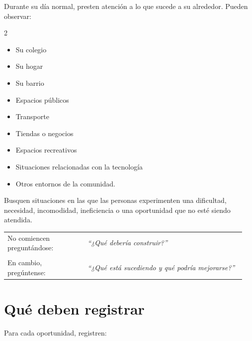 \documentclass[12pt,a4paper]{article}
\begin{document}
	Durante su día normal, presten atención a lo que sucede a su alrededor. Pueden observar:
	
	\begin{multicols}{2}
		\begin{itemize}[leftmargin=0.6cm,itemsep=0pt]
			\item Su colegio
			\item Su hogar
			\item Su barrio
			\item Espacios públicos
			\item Transporte
			\item Tiendas o negocios
			\item Espacios recreativos
			\item Situaciones relacionadas con la tecnología
			\item Otros entornos de la comunidad.
		\end{itemize}
	\end{multicols}
	
	Busquen situaciones en las que las personas experimenten una dificultad, necesidad, incomodidad, ineficiencia o una oportunidad que no esté siendo atendida. \vspace{6mm}
	
	\noindent\begin{tabular}{@{}p{0.32\linewidth}p{0.63\linewidth}@{}}
		No comiencen preguntándose:
		&
		\textit{``¿Qué debería construir?''}
		\\[0.15cm]
		&\\
		En cambio, pregúntense:
		&
		\textit{``¿Qué está sucediendo y qué podría mejorarse?''}
	\end{tabular}
	
	\newpage
	
	\section*{Qué deben registrar}
	
	Para cada oportunidad, registren:
	
\end{document}
